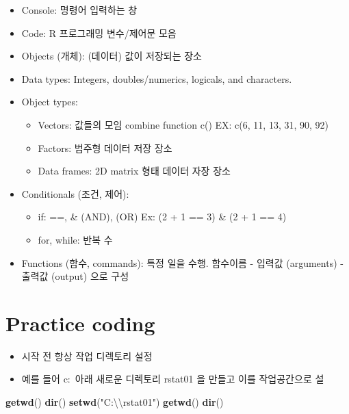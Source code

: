 \documentclass[]{book}
\newenvironment{Shaded}{\begin{snugshade}}{\end{snugshade}}
\newcommand{\KeywordTok}[1]{\textcolor[rgb]{0.13,0.29,0.53}{\textbf{#1}}}
\newcommand{\CharTok}[1]{\textcolor[rgb]{0.31,0.60,0.02}{#1}}
\newcommand{\StringTok}[1]{\textcolor[rgb]{0.31,0.60,0.02}{#1}}
\newcommand{\NormalTok}[1]{#1}
\providecommand{\tightlist}{%
  \setlength{\itemsep}{0pt}\setlength{\parskip}{0pt}}
\begin{document}
\begin{itemize}
\tightlist
\item
  Console: 명령어 입력하는 창
\item
  Code: R 프로그래밍 변수/제어문 모음\\
\item
  Objects (개체): (데이터) 값이 저장되는 장소
\item
  Data types: Integers, doubles/numerics, logicals, and characters.
\item
  Object types:

  \begin{itemize}
  \tightlist
  \item
    Vectors: 값들의 모임 combine function c() EX: c(6, 11, 13, 31, 90, 92)
  \item
    Factors: 범주형 데이터 저장 장소
  \item
    Data frames: 2D matrix 형태 데이터 자장 장소
  \end{itemize}
\item
  Conditionals (조건, 제어):

  \begin{itemize}
  \tightlist
  \item
    if: ==, \& (AND), \textbar{} (OR) Ex: (2 + 1 == 3) \& (2 + 1 == 4)
  \item
    for, while: 반복 수
  \end{itemize}
\item
  Functions (함수, commands): 특정 일을 수행. 함수이름 - 입력값 (arguments) - 출력값 (output) 으로 구성
\end{itemize}

\hypertarget{practice-coding}{%
\section{Practice coding}\label{practice-coding}}

\begin{itemize}
\tightlist
\item
  시작 전 항상 작업 디렉토리 설정
\item
  예를 들어 c:~아래 새로운 디렉토리 rstat01 을 만들고 이를 작업공간으로 설
\end{itemize}

\begin{Shaded}
\begin{Highlighting}[]
\KeywordTok{getwd}\NormalTok{()}
\KeywordTok{dir}\NormalTok{()}
\KeywordTok{setwd}\NormalTok{(}\StringTok{"C:}\CharTok{\textbackslash{}\textbackslash{}}\StringTok{rstat01"}\NormalTok{)}
\KeywordTok{getwd}\NormalTok{()}
\KeywordTok{dir}\NormalTok{()}
\end{Highlighting}
\end{Shaded}
\end{document}
